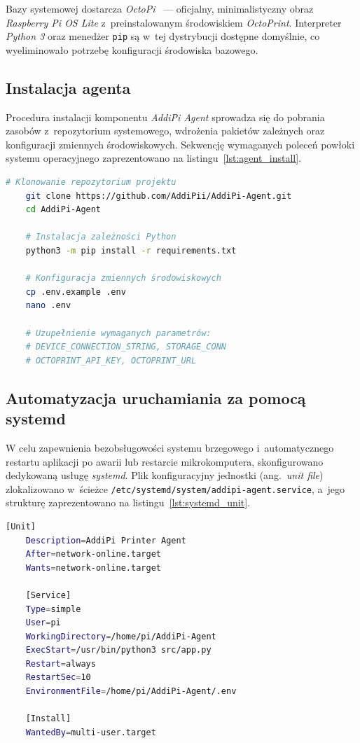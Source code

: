 \documentclass[a4paper,12pt,reqno]{article}
\begin{document}
Bazy systemowej dostarcza \textit{OctoPi}~\cite{octopiimg} --- oficjalny, minimalistyczny obraz \textit{Raspberry Pi OS Lite} z~preinstalowanym środowiskiem \textit{OctoPrint}. Interpreter \textit{Python 3} oraz menedżer \texttt{pip} są w~tej dystrybucji dostępne domyślnie, co wyeliminowało potrzebę konfiguracji środowiska bazowego.

\subsection{Instalacja agenta}

Procedura instalacji komponentu \textit{AddiPi Agent} sprowadza się do pobrania zasobów z~repozytorium systemowego, wdrożenia pakietów zależnych oraz konfiguracji zmiennych środowiskowych. Sekwencję wymaganych poleceń powłoki systemu operacyjnego zaprezentowano na listingu~\ref{lst:agent_install}.


\begin{lstlisting}[language=bash,style=plListing,caption={Instalacja i~inicjalizacja agenta na platformie Raspberry Pi.},label={lst:agent_install}]
	# Klonowanie repozytorium projektu
	git clone https://github.com/AddiPii/AddiPi-Agent.git
	cd AddiPi-Agent
	
	# Instalacja zależności Python
	python3 -m pip install -r requirements.txt
	
	# Konfiguracja zmiennych środowiskowych
	cp .env.example .env
	nano .env
	
	# Uzupełnienie wymaganych parametrów:
	# DEVICE_CONNECTION_STRING, STORAGE_CONN
	# OCTOPRINT_API_KEY, OCTOPRINT_URL
\end{lstlisting}

\subsection{Automatyzacja uruchamiania za pomocą systemd}

W celu zapewnienia bezobsługowości systemu brzegowego i~automatycznego restartu aplikacji po awarii lub restarcie mikrokomputera, skonfigurowano dedykowaną usługę \textit{systemd}. Plik konfiguracyjny jednostki (ang.~\textit{unit file}) zlokalizowano w~ścieżce \newline\texttt{/etc/systemd/system/addipi-agent.service}, a~jego strukturę zaprezentowano na listingu~\ref{lst:systemd_unit}.

\begin{lstlisting}[language=bash,style=plListing,caption={Plik jednostki konfiguracji addipi-agent.service dla menedżera systemd.},label={lst:systemd_unit}]
	[Unit]
	Description=AddiPi Printer Agent
	After=network-online.target
	Wants=network-online.target
	
	[Service]
	Type=simple
	User=pi
	WorkingDirectory=/home/pi/AddiPi-Agent
	ExecStart=/usr/bin/python3 src/app.py
	Restart=always
	RestartSec=10
	EnvironmentFile=/home/pi/AddiPi-Agent/.env
	
	[Install]
	WantedBy=multi-user.target
\end{lstlisting}
\end{document}

